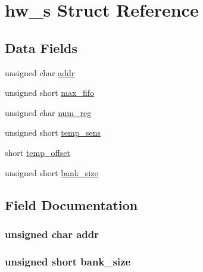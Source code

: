 \hypertarget{structhw__s}{}\section{hw\+\_\+s Struct Reference}
\label{structhw__s}
\subsection*{Data Fields}
\begin{DoxyCompactItemize}
\item 
unsigned char \hyperlink{structhw__s_a4c34a946600e9d68b6355d23f54d291b}{addr}
\item 
unsigned short \hyperlink{structhw__s_a36e9e2aea952cea137504c539cdb97dc}{max\+\_\+fifo}
\item 
unsigned char \hyperlink{structhw__s_a0c4fc172c338358ef1754c16c627eb08}{num\+\_\+reg}
\item 
unsigned short \hyperlink{structhw__s_ab73e7066167ecd424b3a619cddd0939a}{temp\+\_\+sens}
\item 
short \hyperlink{structhw__s_ac3cd6878189d0ca0cb389c5ab11c8395}{temp\+\_\+offset}
\item 
unsigned short \hyperlink{structhw__s_a9e26f1784621a59cabcbfff28dc0b8ba}{bank\+\_\+size}
\end{DoxyCompactItemize}


\subsection{Field Documentation}
\subsubsection[{\texorpdfstring{addr}{addr}}]{\setlength{\rightskip}{0pt plus 5cm}unsigned char addr}\hypertarget{structhw__s_a4c34a946600e9d68b6355d23f54d291b}{}\label{structhw__s_a4c34a946600e9d68b6355d23f54d291b}
\subsubsection[{\texorpdfstring{bank\+\_\+size}{bank_size}}]{\setlength{\rightskip}{0pt plus 5cm}unsigned short bank\+\_\+size}\hypertarget{structhw__s_a9e26f1784621a59cabcbfff28dc0b8ba}{}\label{structhw__s_a9e26f1784621a59cabcbfff28dc0b8ba}
